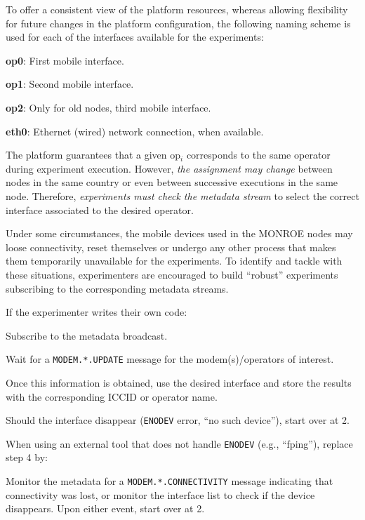 \documentclass[a4paper,10pt]{article}
\newcommand{\monroe}{MONROE}
\newcommand{\identifier}[1]{{\texttt{\small{#1}}}}
\begin{document}
To offer a consistent view of the platform resources, whereas allowing flexibility for future changes in the platform configuration, the following naming scheme is used for each of the interfaces available for the experiments:
\begin{enumerate*}
	\item [\textbf{op0}:] First mobile interface.
	\item [\textbf{op1}:] Second mobile interface.
	\item [\textbf{op2}:] Only for old nodes, third mobile interface.
	\item [\textbf{eth0}:] Ethernet (wired) network connection, when available.
\end{enumerate*}
The platform guarantees that a given op$_i$ corresponds to the same operator during experiment execution.
However, \emph{the assignment may change} between nodes in the same country or even between successive executions in the same node.
Therefore, \emph{experiments must check the metadata stream} to select the correct interface associated to the desired operator.

Under some circumstances, the mobile devices used in the \monroe{} nodes may loose connectivity, reset themselves or undergo any other process that makes them temporarily unavailable for the experiments.
To identify and tackle with these situations, experimenters are encouraged to build ``robust'' experiments subscribing to the corresponding metadata streams.

If the experimenter writes their own code:
\begin{enumerate*}
	\item Subscribe to the metadata broadcast.
	\item Wait for a \identifier{MODEM.*.UPDATE} message for the modem(s)/operators of interest.
	\item Once this information is obtained, use the desired interface and store the results with the corresponding ICCID or operator name.
	\item Should the interface disappear (\identifier{ENODEV} error, ``no such device''), start over at 2.
\end{enumerate*}
	
When using an external tool that does not handle \identifier{ENODEV} (e.g., ``fping''), replace step 4 by:
\begin{itemize*}
	\item Monitor the metadata for a \identifier{MODEM.*.CONNECTIVITY} message indicating that connectivity was lost, or monitor the interface list to check if the device disappears. Upon either event, start over at 2.
\end{itemize*}
	
\end{document}
